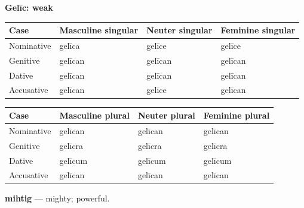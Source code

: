 \textbf{Gelīc: weak}

\par\begingroup
\fontsize{10.5}{13.2}\selectfont
\setlength{\LTleft}{0pt}\setlength{\LTright}{\fill}
\noindent
\begin{tabular}{@{}>{\raggedright\arraybackslash}p{22.0mm}>{\raggedright\arraybackslash}p{31.188mm}>{\raggedright\arraybackslash}p{31.188mm}>{\raggedright\arraybackslash}p{31.188mm}@{}}
\toprule
\textbf{Case} & \textbf{Masculine singular} & \textbf{Neuter singular} & \textbf{Feminine singular} \\
\midrule
Nominative & gelīca & gelīce & gelīce \\
Genitive & gelīcan & gelīcan & gelīcan \\
Dative & gelīcan & gelīcan & gelīcan \\
Accusative & gelīcan & gelīce & gelīcan \\
\bottomrule
\end{tabular}
\par\endgroup
\par\addvspace{5pt}
\par\begingroup
\fontsize{10.5}{13.2}\selectfont
\setlength{\LTleft}{0pt}\setlength{\LTright}{\fill}
\noindent
\begin{tabular}{@{}>{\raggedright\arraybackslash}p{22.0mm}>{\raggedright\arraybackslash}p{31.188mm}>{\raggedright\arraybackslash}p{31.188mm}>{\raggedright\arraybackslash}p{31.188mm}@{}}
\toprule
\textbf{Case} & \textbf{Masculine plural} & \textbf{Neuter plural} & \textbf{Feminine plural} \\
\midrule
Nominative & gelīcan & gelīcan & gelīcan \\
Genitive & gelīcra & gelīcra & gelīcra \\
Dative & gelīcum & gelīcum & gelīcum \\
Accusative & gelīcan & gelīcan & gelīcan \\
\bottomrule
\end{tabular}
\par\endgroup

\textbf{mihtig} — mighty; powerful.

